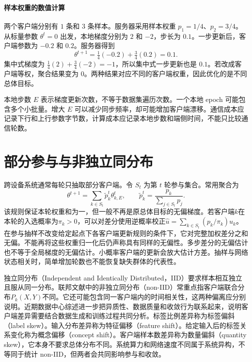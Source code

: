 \paragraph{样本权重的数值计算}
两个客户端分别有 $1$ 条和 $3$ 条样本。服务器采用样本权重 $p_1=1/4$、$p_2=3/4$。从标量参数 $\theta^t=0$ 出发，本地梯度分别为 $2$ 和 $-2$，步长为 $0.1$。一步更新后，客户端参数为 $-0.2$ 和 $0.2$。服务器得到
\[
 \theta^{t+1}=\tfrac14(-0.2)+\tfrac34(0.2)=0.1.
\]
集中式梯度为 $\frac14(2)+\frac34(-2)=-1$，所以集中式一步更新也是 $0.1$。若改成客户端等权，聚合结果变为 $0$。两种结果对应不同的客户端权重，因此优化的是不同总体目标。

本地步数 $E$ 表示梯度更新次数，不等于数据集遍历次数。一个本地 epoch 可能包含多个小批量。增大 $E$ 可以减少同步频率，却可能增加客户端漂移。通信成本应记录下行和上行参数字节数，计算成本应记录本地步数和端侧时间，不能只比较通信轮数。

\section{部分参与与非独立同分布}

跨设备系统通常每轮只抽取部分客户端。令 $S_t$ 为第 $t$ 轮参与集合。常用聚合为
\begin{equation}
 \theta^{t+1}=\sum_{k\in S_t}\widetilde p_k^t\theta_{k,E}^t,
 \qquad
 \widetilde p_k^t=\frac{p_k}{\sum_{j\in S_t}p_j}.
 \label{eq:federated-inclusion-gradient}
\end{equation}
该规则保证本轮权重和为一，但一般不再是原总体目标的无偏梯度。若客户端$k$在本轮的入选概率为$\pi_k>0$，可以对差分使用逆概率校正$\widehat u=\sum_{k\in S_t}(p_k/\pi_k)u_k$。在参与抽样不改变给定起点下各客户端更新规则的条件下，它对完整加权差分之和无偏。不能再将这些权重归一化后仍声称具有同样的无偏性。多步差分的无偏估计也不等于全局梯度的无偏估计。小概率客户端的更新会放大估计方差。抽样与网络状态相关时，简单增加轮数也不能恢复缺失群体的代表性。

独立同分布（Independent and Identically Distributed，IID）要求样本相互独立且服从同一分布。联邦文献中的非独立同分布（non-IID）常重点指客户端联合分布$P_k(X,Y)$不同。它还可能包含同一客户端内的时间相关性，这两种偏离应分别说明。近期数据中心综述进一步把异质性、数据质量和收敛行为联系起来，说明客户端差异需要结合数据生成和训练过程共同分析\cite{nguyen2026datacentricfl}。标签比例差异称为标签偏斜（label skew）。输入分布差异称为特征偏移（feature shift）。给定输入后的标签关系变化称为概念偏移（concept shift）。客户端样本数差异称为数量偏斜（quantity skew），它本身不要求总体分布不同。系统算力和网络速度不同属于系统异构，不等同于统计 non-IID，但两者会共同影响参与和收敛。


